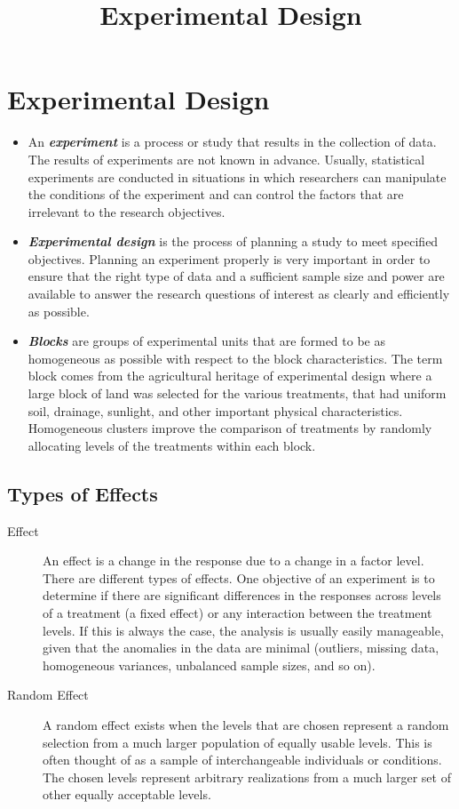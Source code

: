 \documentclass[12pt]{article}
\title{Experimental Design}
\begin{document}
\section*{Experimental Design}
\begin{itemize}
\item An \textit{\textbf{experiment}} is a process or study that results in the collection of data. The results of
experiments are not known in advance. Usually, statistical experiments are conducted in
situations in which researchers can manipulate the conditions of the experiment and can
control the factors that are irrelevant to the research objectives. 

\item \textit{\textbf{Experimental design}} is the process of planning a study to meet specified objectives. Planning an experiment properly is very important in order to ensure that the right type of data and a sufficient sample size and power are available to answer the research questions of interest as
clearly and efficiently as possible.

\item \textit{\textbf{Blocks}} are groups of experimental units that are formed to be as homogeneous as possible with respect to the block characteristics. The term block comes from the agricultural heritage of experimental design where a large block of land was selected for the various treatments, that had uniform soil, drainage, sunlight, and other important physical characteristics. Homogeneous clusters improve the comparison of treatments by randomly allocating levels of the treatments within each block.
\end{itemize}
\newpage
\subsection*{Types of Effects}
\begin{description}
\item[Effect]
An effect is a change in the response due to a change in a factor level. There are different
types of effects. One objective of an experiment is to determine if there are significant
differences in the responses across levels of a treatment (a fixed effect) or any interaction
between the treatment levels. If this is always the case, the analysis is usually easily
manageable, given that the anomalies in the data are minimal (outliers, missing data,
homogeneous variances, unbalanced sample sizes, and so on).
\item[Random Effect]
A random effect exists when the levels that are chosen represent a random selection from a
much larger population of equally usable levels. This is often thought of as a sample of
interchangeable individuals or conditions. The chosen levels represent arbitrary realizations
from a much larger set of other equally acceptable levels.
\end{description}
\end{document}
